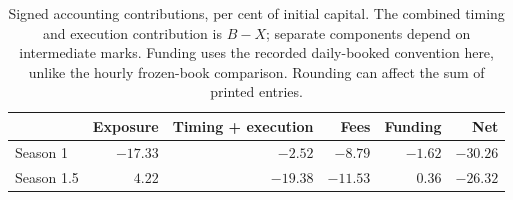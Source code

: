 \begin{table}[ht]
\centering\small
\caption{Signed accounting contributions, per cent of initial capital.
The combined timing and execution contribution is $B-X$; separate components
depend on intermediate marks. Funding uses the recorded daily-booked
convention here, unlike the hourly frozen-book comparison. Rounding can
affect the sum of printed entries.}
\label{tab:pnl}
\begin{tabular}{lrrrrr}
\toprule
 & Exposure & Timing + execution & Fees & Funding & Net \\
\midrule
Season 1 & $-17.33$ & $-2.52$ & $-8.79$ & $-1.62$ & $-30.26$ \\
Season 1.5 & $4.22$ & $-19.38$ & $-11.53$ & $0.36$ & $-26.32$ \\
\bottomrule
\end{tabular}
\end{table}
